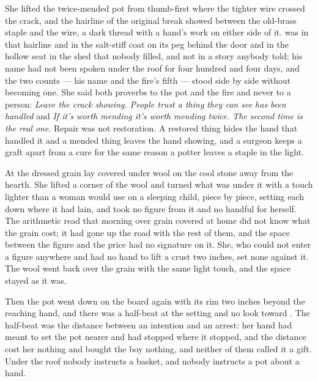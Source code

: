 She lifted the twice-mended pot from  thumb-first where the tighter wire crossed the crack, and the hairline of the original break showed between the old-brass staple and the wire, a dark thread with a hand's work on either side of it.  was in that hairline and in the salt-stiff coat on its peg behind the door and in the hollow seat in the shed that nobody filled, and not in a story anybody told; his name had not been spoken under the roof for four hundred and four days, and the two counts --- his name and the fire's fifth --- stood side by side without becoming one. She said both proverbs to the pot and the fire and never to a person: \emph{Leave the crack showing. People trust a thing they can see has been handled} and \emph{If it's worth mending it's worth mending twice. The second time is the real one}. Repair was not restoration. A restored thing hides the hand that handled it and a mended thing leaves the hand showing, and a surgeon keeps a graft apart from a cure for the same reason a potter leaves a staple in the light.

At  the dressed grain lay covered under wool on the cool stone away from the hearth. She lifted a corner of the wool and turned what was under it with a touch lighter than a woman would use on a sleeping child, piece by piece, setting each down where it had lain, and took no figure from it and no handful for herself. The arithmetic read that morning over grain covered at home did not know what the grain cost; it had gone up the road with the rest of them, and the space between the figure and the price had no signature on it. She, who could not enter a figure anywhere and had no hand to lift a crust two inches, set none against it. The wool went back over the grain with the same light touch, and the space stayed as it was.

Then the pot went down on the board again with its rim two inches beyond the reaching hand, and there was a half-beat at the setting and no look toward . The half-beat was the distance between an intention and an arrest: her hand had meant to set the pot nearer and had stopped where it stopped, and the distance cost her nothing and bought the boy nothing, and neither of them called it a gift. Under the roof nobody instructs a basket, and nobody instructs a pot about a hand.

